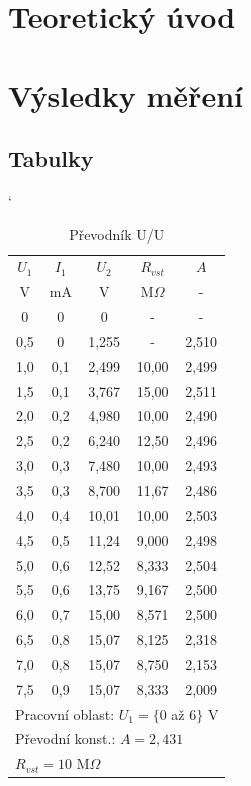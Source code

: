 \documentclass[a4paper, czech]{article}
\begin{document}
\section{Teoretický úvod}

\section{Výsledky měření}

\subsection{Tabulky}

\begin{minipage}{0.48\textwidth}
    \begin{table}[H]
        \catcode`
        \centering
        \caption{Převodník U/U}
        \begin{tabular}{ccccc}
            \toprule
            $U_1$  & $I_1$  & $U_2$    & $R_{vst}$  & $A$     \\
            \cmidrule(rl){1-1}
            \cmidrule(rl){2-2}
            \cmidrule(rl){3-3}
            \cmidrule(rl){4-4}
            \cmidrule(rl){5-5}
            V   & mA  & V     & M$\Omega$    & -     \\
            \midrule
            0   & 0   & 0     & -     & -     \\
            0,5 & 0   & 1,255 & -     & 2,510 \\
            1,0 & 0,1 & 2,499 & 10,00 & 2,499 \\
            1,5 & 0,1 & 3,767 & 15,00 & 2,511 \\
            2,0 & 0,2 & 4,980 & 10,00 & 2,490 \\
            2,5 & 0,2 & 6,240 & 12,50 & 2,496 \\
            3,0 & 0,3 & 7,480 & 10,00 & 2,493 \\
            3,5 & 0,3 & 8,700 & 11,67 & 2,486 \\
            4,0 & 0,4 & 10,01 & 10,00 & 2,503 \\
            4,5 & 0,5 & 11,24 & 9,000 & 2,498 \\
            5,0 & 0,6 & 12,52 & 8,333 & 2,504 \\
            5,5 & 0,6 & 13,75 & 9,167 & 2,500 \\
            6,0 & 0,7 & 15,00 & 8,571 & 2,500 \\
            6,5 & 0,8 & 15,07 & 8,125 & 2,318 \\
            7,0 & 0,8 & 15,07 & 8,750 & 2,153 \\
            7,5 & 0,9 & 15,07 & 8,333 & 2,009 \\
            \bottomrule
            \multicolumn{5}{l}{Pracovní oblast: $U_1 = \{0$ až $6\}$ V} \\
            \multicolumn{5}{l}{Převodní konst.: $A = 2,431$} \\
            \multicolumn{5}{l}{$R_{vst} = 10$ M$\Omega$} \\
        \end{tabular}
    \end{table}
\end{minipage}
\end{document}
